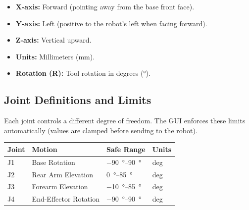 \documentclass[11pt,a4paper]{article}
\begin{document}
\begin{center}
\end{center}

\vspace{4pt}
\begin{itemize}
  \item \textbf{\color{AxisRed}X-axis:} Forward (pointing away from the base front face).
  \item \textbf{\color{AxisBlue}Y-axis:} Left (positive to the robot's left when facing forward).
  \item \textbf{\color{AxisGreen}Z-axis:} Vertical upward.
  \item \textbf{Units:} Millimeters (\si{\mm}).
  \item \textbf{Rotation (R):} Tool rotation in degrees (\si{\degree}).
\end{itemize}

\subsection{Joint Definitions and Limits}

Each joint controls a different degree of freedom. The GUI enforces these limits automatically (values are clamped before sending to the robot).

\begin{tabularx}{\linewidth}{@{}llXl@{}}
  \toprule
  \textbf{Joint} & \textbf{Motion} & \textbf{Safe Range} & \textbf{Units} \\
  \midrule
  J1 & Base Rotation          & \qtyrange{-90}{90}{\degree}   & deg \\
  J2 & Rear Arm Elevation     & \qtyrange{0}{85}{\degree}     & deg \\
  J3 & Forearm Elevation      & \qtyrange{-10}{85}{\degree}   & deg \\
  J4 & End-Effector Rotation  & \qtyrange{-90}{90}{\degree}   & deg \\
  \bottomrule
\end{tabularx}
\end{document}
